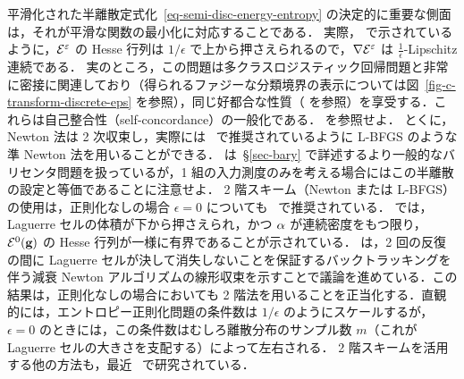 \begin{rem}[2 階法とロジスティック回帰との関連]\label{rem-second-order-smoothness}
	平滑化された半離散定式化~\eqref{eq-semi-disc-energy-entropy} の決定的に重要な側面は，それが平滑な関数の最小化に対応することである．
	実際，\citep{genevay2016stochastic} で示されているように，$\mathcal{E}^\varepsilon$ の Hesse 行列は $1/\epsilon$ で上から押さえられるので，$\nabla \mathcal{E}^\varepsilon$ は $\frac{1}{\epsilon}$-Lipschitz 連続である．
	実のところ，この問題は多クラスロジスティック回帰問題と非常に密接に関連しており（得られるファジーな分類境界の表示については図~\ref{fig-c-transform-discrete-eps} を参照），同じ好都合な性質（\citep{hosmer2013applied} を参照）を享受する．これらは自己整合性（self-concordance）の一般化である．\citep{bach2010self} を参照せよ．
	とくに，Newton 法は 2 次収束し，実際には~\citep{2016-Cuturi-siims} で推奨されているように L-BFGS のような準 Newton 法を用いることができる．\citep{2016-Cuturi-siims} は~\S\ref{sec-bary} で詳述するより一般的なバリセンタ問題を扱っているが，1 組の入力測度のみを考える場合にはこの半離散の設定と等価であることに注意せよ．
	2 階スキーム（Newton または L-BFGS）の使用は，正則化なしの場合 $\epsilon=0$ についても~\citep{Merigot11,de2012blue,levy2015numerical} で推奨されている．\citep[Theo. 5.1]{kitagawa2016newton} では，Laguerre セルの体積が下から押さえられ，かつ $\alpha$ が連続密度をもつ限り，$\mathcal{E}^0(\mathrm{\textbf{g}})$ の Hesse 行列が一様に有界であることが示されている．\citeauthor{kitagawa2016newton} は，2 回の反復の間に Laguerre セルが決して消失しないことを保証するバックトラッキングを伴う減衰 Newton アルゴリズムの線形収束を示すことで議論を進めている．この結果は，正則化なしの場合においても 2 階法を用いることを正当化する．直観的には，エントロピー正則化問題の条件数は $1/\epsilon$ のようにスケールするが，$\epsilon=0$ のときには，この条件数はむしろ離散分布のサンプル数 $m$（これが Laguerre セルの大きさを支配する）によって左右される．
	2 階スキームを活用する他の方法も，最近~\citep{knight2013fast,sugiyama2017tensor,cohen2017matrix,allen2017much} で研究されている．
\end{rem}




